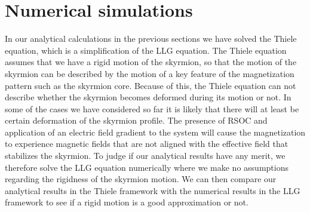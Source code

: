 \section{Numerical simulations}
In our analytical calculations in the previous sections we have solved the Thiele equation, which is a simplification of the LLG equation. The Thiele equation assumes that we have a rigid motion of the skyrmion, so that the motion of the skyrmion can be described by the motion of a key feature of the magnetization pattern such as the skyrmion core. Because of this, the Thiele equation can not describe whether the skyrmion becomes deformed during its motion or not. In some of the cases we have considered so far it is likely that there will at least be certain deformation of the skyrmion profile. The presence of RSOC and application of an electric field gradient to the system will cause the magnetization to experience magnetic fields that are not aligned with the effective field that stabilizes the skyrmion. To judge if our analytical results have any merit, we therefore solve the LLG equation numerically where we make no assumptions regarding the rigidness of the skyrmion motion. We can then compare our analytical results in the Thiele framework with the numerical results in the LLG framework to see if a rigid motion is a good approximation or not.
